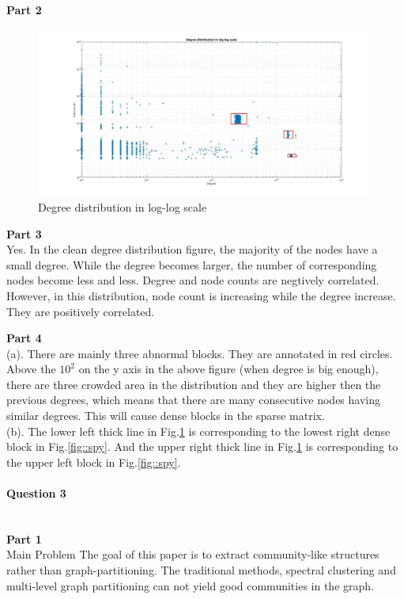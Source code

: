 \documentclass[11pt]{article}
\begin{document}
\noindent
\textbf{Part 2} \\
\begin{figure}[H]
    \centering
    \includegraphics[width=\linewidth]{figs/q2.jpg}
    \caption{Degree distribution in log-log scale}
    \label{fig::deg_log}
\end{figure}

\noindent
\textbf{Part 3} \\
Yes. In the clean degree distribution figure, the majority of the nodes have a small degree. While the degree becomes larger, the number of corresponding nodes become less and less. Degree and node counts are negtively correlated. However, in this distribution, node count is increasing while the degree increase. They are positively correlated.

\noindent
\textbf{Part 4} \\
(a). There are mainly three abnormal blocks. They are annotated in red circles. Above the $10^2$ on the y axis in the above figure (when degree is big enough), there are three crowded area in the distribution and they are higher then the previous degrees, which means that there are many consecutive nodes having similar degrees. This will cause dense blocks in the sparse matrix. \\
\noindent
(b). The lower left thick line in Fig.\ref{fig::deg_log} is corresponding to the lowest right dense block in Fig.\ref{fig::spy}. And the upper right thick line in Fig.\ref{fig::deg_log} is corresponding to the upper left block in Fig.\ref{fig::spy}.

\paragraph{Question 3}\mbox{} \\
\noindent
\textbf{Part 1} \\
\noindent
Main Problem \newline
The goal of this paper is to extract community-like structures rather than graph-partitioning. The traditional methods, spectral clustering and multi-level graph partitioning can not yield good communities in the graph.
\end{document}

